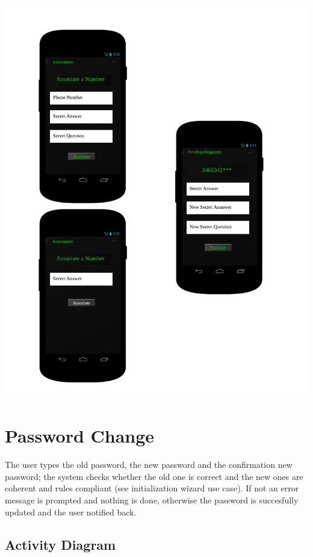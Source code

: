 \includegraphics[scale=0.7]{images/SMP_design}

\section{Password Change}

The user types the old password, the new password and the confirmation new
password; the system checks whether the old one is correct and the new ones
are coherent and rules compliant (see initialization wizard use case). If not
an error message is prompted and nothing is done, otherwise the password is
succesfully updated and the user notified back.

\subsection{Activity Diagram}

